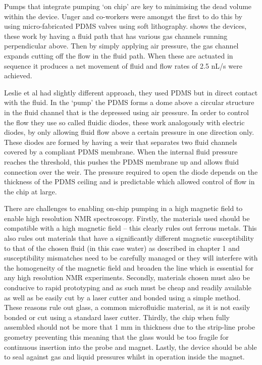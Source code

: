 Pumps that integrate pumping ‘on chip’ are key to minimising the dead volume within the device.
Unger and co-workers \citep{RN59} were amongst the first to do this by using micro-fabricated PDMS valves
using soft lithography.  shows the devices, these work by having a fluid path that has various gas
channels running perpendicular above. Then by simply applying air pressure, the gas channel expands cutting off
the flow in the fluid path. When these are actuated in sequence it produces a net movement
of fluid and flow rates of 2.5 nL/s were achieved.

Leslie et al \citep{RN100} had slightly different
approach, they used PDMS but in direct contact with the fluid. In the ‘pump’ the PDMS forms
a dome above a circular structure in the fluid channel that is the depressed using air
pressure. In order to control the flow they use so called fluidic diodes, these work
analogously with electric diodes, by only allowing fluid flow above a certain pressure in
one direction only. These diodes are formed by having a weir that separates two fluid
channels covered by a compliant PDMS membrane. When the internal fluid pressure reaches the
threshold, this pushes the PDMS membrane up and allows fluid connection over the weir. The
pressure required to open the diode depends on the thickness of the PDMS ceiling and is
predictable which allowed control of flow in the chip at large.

There are challenges to enabling on-chip pumping in a high magnetic field to enable high
resolution NMR spectroscopy. Firstly, the materials used should be compatible with a high
magnetic field – this clearly rules out ferrous metals. This also rules out materials that
have a significantly different magnetic susceptibility to that of the chosen fluid (in this
case water) as described in chapter 1 and susceptibility mismatches need to be carefully
managed or they will interfere with the homogeneity of the magnetic field and broaden the line which is
essential for any high resolution NMR experiments. Secondly, materials chosen must also be
conducive to rapid prototyping and as such must be cheap and readily available as well as
be easily cut by a laser cutter and bonded using a simple method. These reasons rule out
glass, a common microfluidic material, as it is not easily bonded or cut using a standard
laser cutter. Thirdly, the chip when fully assembled should not be more
that 1 mm in thickness due to the strip-line probe geometry preventing this meaning that
the glass would be too fragile for continuous insertion into the probe and magnet. Lastly,
the device should be able to seal against gas and liquid pressures whilst in operation
inside the magnet.

